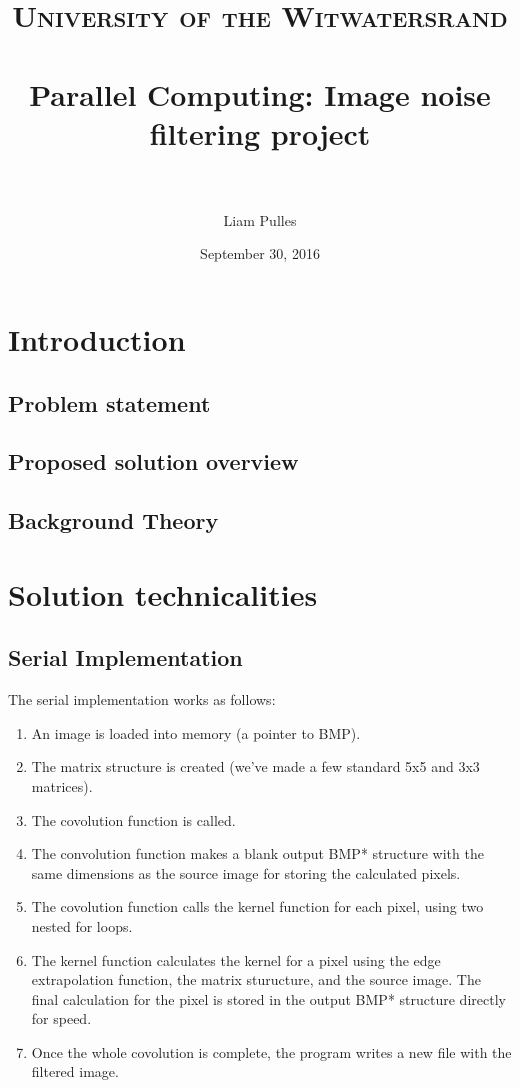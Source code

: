 \documentclass[paper=a4, fontsize=11pt]{scrartcl} %
\title{	
\normalfont \normalsize 
\textsc{University of the Witwatersrand} \\ [25pt] %
\horrule{0.5pt} \\[0.4cm] %
\huge Parallel Computing: Image noise filtering project \\ %
\horrule{2pt} \\[0.5cm] %
}
\author{Liam Pulles} %
\date{\normalsize September 30, 2016} %
\numberwithin{equation}{section} %
\numberwithin{figure}{section} %
\numberwithin{table}{section} %
\begin{document}
\maketitle %

\section{Introduction}
\subsection{Problem statement}
\subsection{Proposed solution overview}
\subsection{Background Theory}

\section{Solution technicalities}
\subsection{Serial Implementation}
The serial implementation works as follows:
\begin{enumerate}
\item An image is loaded into memory (a pointer to BMP).
\item The matrix structure is created (we've made a few standard 5x5 and 3x3 matrices).
\item The covolution function is called.
\item The convolution function makes a blank output BMP* structure with the same dimensions as the source image for storing the calculated pixels. 
\item The covolution function calls the kernel function for each pixel, using two nested for loops.
\item The kernel function calculates the kernel for a pixel using the edge extrapolation function, the matrix sturucture, and the source image. The final calculation for the pixel is stored in the output BMP* structure directly for speed.
\item Once the whole covolution is complete, the program writes a new file with the filtered image.
\end{enumerate}
  
\end{document}
